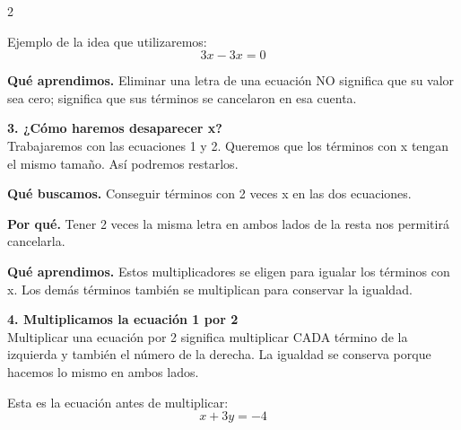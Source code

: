 \documentclass[11pt,a4paper,landscape]{article}
\begin{document}
\begin{multicols*}{2}
\begin{minipage}{\linewidth}
\par\smallskip Ejemplo de la idea que utilizaremos:
\[3x-3x=0\]
\par\smallskip\textbf{Qué aprendimos.} Eliminar una letra de una ecuación NO significa que su valor sea cero; significa que sus términos se cancelaron en esa cuenta.
\end{minipage}\par\medskip
\noindent\begin{minipage}{\linewidth}\textbf{3. ¿Cómo haremos desaparecer x?}\\[2pt]Trabajaremos con las ecuaciones 1 y 2. Queremos que los términos con x tengan el mismo tamaño. Así podremos restarlos.
\par\smallskip\textbf{Qué buscamos.} Conseguir términos con 2 veces x en las dos ecuaciones.
\par\smallskip\textbf{Por qué.} Tener 2 veces la misma letra en ambos lados de la resta nos permitirá cancelarla.
\par{}\par\smallskip
\par\smallskip\textbf{Qué aprendimos.} Estos multiplicadores se eligen para igualar los términos con x. Los demás términos también se multiplican para conservar la igualdad.
\end{minipage}\par\medskip
\noindent\begin{minipage}{\linewidth}\textbf{4. Multiplicamos la ecuación 1 por 2}\\[2pt]Multiplicar una ecuación por 2 significa multiplicar CADA término de la izquierda y también el número de la derecha. La igualdad se conserva porque hacemos lo mismo en ambos lados.
\par\smallskip Esta es la ecuación antes de multiplicar:
\[x + 3y = -4\]

\end{minipage}
\end{multicols*}
\end{document}

